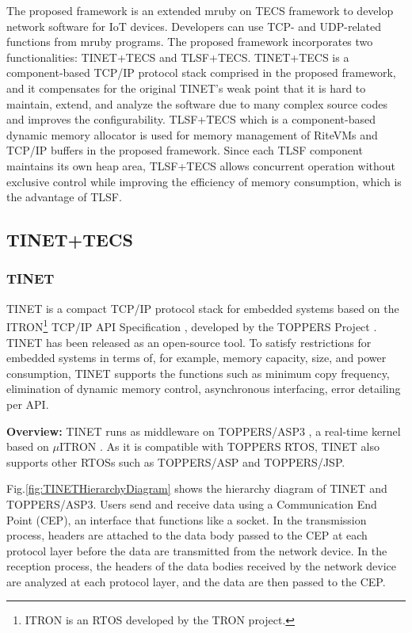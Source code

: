 \documentclass[JIP]{ipsj_v2/UTF8/ipsj}
\begin{document}
The proposed framework is an extended mruby on TECS framework to develop network software for IoT devices.
Developers can use TCP- and UDP-related functions from mruby programs.
The proposed framework incorporates two functionalities: TINET+TECS and TLSF+TECS.
TINET+TECS is a component-based TCP/IP protocol stack comprised in the proposed framework, and it compensates for the original TINET's weak point that it is hard to maintain, extend, and analyze the software due to many complex source codes and improves the configurability.
TLSF+TECS which is a component-based dynamic memory allocator is used for memory management of RiteVMs and TCP/IP buffers in the proposed framework.
Since each TLSF component maintains its own heap area, TLSF+TECS allows concurrent operation without exclusive control while improving the efficiency of memory consumption, which is the advantage of TLSF.


\subsection{TINET+TECS}
\label{sec:TINET+TECS}

\subsubsection{TINET}

TINET is a compact TCP/IP protocol stack for embedded systems based on the ITRON\footnote{ITRON is an RTOS developed by the TRON project.} TCP/IP API Specification \cite{url:ITRON_TCP/IP_API_Spec}, developed by the TOPPERS Project \cite{url:TOPPERS}.
TINET has been released as an open-source tool.
To satisfy restrictions for embedded systems in terms of, for example, memory capacity, size, and power consumption, TINET supports the functions such as minimum copy frequency, elimination of dynamic memory control, asynchronous interfacing, error detailing per API.

{\bf Overview:}
TINET runs as middleware on TOPPERS/ASP3 \cite{par:ASP3} \cite{url:ASP3}, a real-time kernel based on $\mu$ITRON \cite{par:microITRON}.
As it is compatible with TOPPERS RTOS, TINET also supports other RTOSs such as TOPPERS/ASP and TOPPERS/JSP.

Fig.\ref{fig:TINETHierarchyDiagram} shows the hierarchy diagram of TINET and TOPPERS/ASP3.
Users send and receive data using a Communication End Point (CEP), an interface that functions like a socket.
In the transmission process, headers are attached to the data body passed to the CEP at each protocol layer before the data are transmitted from the network device.
In the reception process, the headers of the data bodies received by the network device are analyzed at each protocol layer, and the data are then passed to the CEP.
\end{document}
